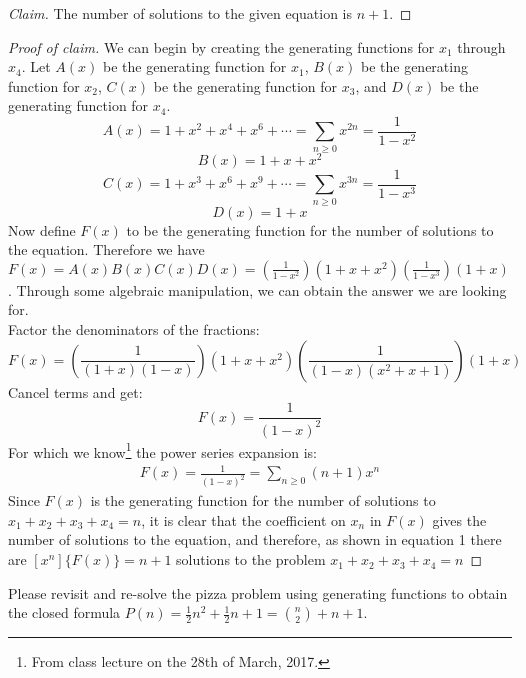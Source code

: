 \documentclass[12pt]{article}
\newenvironment{problem}[2][Problem]{\begin{trivlist}
\item[\hskip \labelsep {\bfseries #1}\hskip \labelsep {\bfseries #2.}]}{\end{trivlist}}
\begin{document}
\begin{proof}[Claim]
The number of solutions to the given equation is $n+1$.
\end{proof}

\begin{proof}[Proof of claim]
We can begin by creating the generating functions for $x_1$ through $x_4$. Let $A(x)$ be the generating function for $x_1$, $B(x)$ be the generating function for $x_2$, $C(x)$ be the generating function for $x_3$, and $D(x)$ be the generating function for $x_4$.
\[A(x)=1 + x^2+x^4+x^6 +\cdots = \sum_{n \geq 0}x^{2n}=\frac{1}{1-x^2}\]
\[B(x)=1+x+x^2\]
\[C(x)=1+x^3+x^6+x^9+\cdots=\sum_{n \geq 0}x^{3n}=\frac{1}{1-x^3}\]
\[D(x)=1+x\]
Now define $F(x)$ to be the generating function for the number of solutions to the equation. Therefore we have $F(x)=A(x)B(x)C(x)D(x)=(\frac{1}{1-x^2})(1+x+x^2)(\frac{1}{1-x^3})(1+x)$. Through some algebraic manipulation, we can obtain the answer we are looking for.\\
Factor the denominators of the fractions:
\[F(x)=(\frac{1}{(1+x)(1-x)})(1+x+x^2)(\frac{1}{(1-x)(x^2+x+1)})(1+x)\]
Cancel terms and get:
\[F(x)=\frac{1}{(1-x)^2}\]
For which we know\footnote{From class lecture on the 28th of March, 2017.} the power series expansion is:
\begin{eqnarray}
F(x)=\frac{1}{(1-x)^2}=\sum_{n \geq 0}(n+1)x^n
\end{eqnarray}
Since $F(x)$ is the generating function for the number of solutions to $x_1+x_2+x_3+x_4=n$, it is clear that the coefficient on $x_n$ in $F(x)$ gives the number of solutions to the equation, and therefore, as shown in equation 1 there are $[x^n]\{F(x)\} = n + 1$ solutions to the problem $x_1+x_2+x_3+x_4=n$
\end{proof}

\begin{problem}{3}
Please revisit and re-solve the pizza problem using generating functions to obtain the closed formula $P(n)=\frac{1}{2}n^2+\frac{1}{2}n+1= {n\choose2} +n + 1$.
\end{problem}
\end{document}
